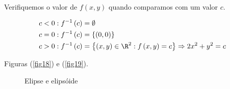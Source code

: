 \documentclass[11pt, oneside, a4paper]{gsm-l}
\begin{document}
\begin{sol}
    Verifiquemos o valor de $f\left( {x,y} \right)$ quando comparamos com um valor $c$.

\[
\begin{gathered}
c < 0:f^{ - 1} \left( c \right) = \emptyset  \hfill \\
  c = 0:f^{ - 1} \left( c \right) = \left\{ {\left( {0,0} \right)} \right\} \hfill \\
  c > 0:f^{ - 1} \left( c \right) = \left\{ {\left( {x,y} \right) \in \R^2 :f\left( {x,y} \right) = c} \right\} \Rightarrow 2x^2  + y^2  = c \hfill \\
\end{gathered}
\]

Figuras (\ref{fig18}) e (\ref{fig19}).

\begin{figure}[!h]
  \centering
  \quad
  \caption{Elipse e elips\'oide}
\end{figure}

\end{sol}
\end{document}
